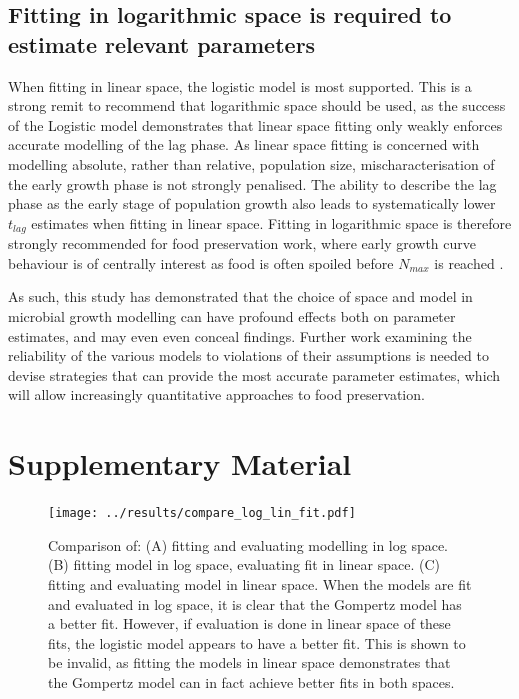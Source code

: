 \documentclass[11pt, a4paper]{article}
\newcommand{\beginsupplement}{%
        \setcounter{table}{0}
        \renewcommand{\thetable}{S\arabic{table}}%
        \setcounter{figure}{0}
        \renewcommand{\thefigure}{S\arabic{figure}}%
}
\begin{document}
\begin{linenumbers}
\subsection{Fitting in logarithmic space is required to estimate relevant parameters}
When fitting in linear space, the logistic model is most supported. This is a strong remit to recommend that logarithmic space should be used, as the success of the Logistic model demonstrates that linear space fitting only weakly enforces accurate modelling of the lag phase. As linear space fitting is concerned with modelling absolute, rather than relative, population size, mischaracterisation of the early growth phase is not strongly penalised. The ability to describe the lag phase as the early stage of population growth also leads to systematically lower $t_{lag}$ estimates when fitting in linear space. Fitting in logarithmic space is therefore strongly recommended for food preservation work, where early growth curve behaviour is of centrally interest as food is often spoiled before $N_{max}$ is reached \cite{MicrobialGrowth}.

As such, this study has demonstrated that the choice of space and model in microbial growth modelling can have profound effects both on parameter estimates, and may even even conceal findings. Further work examining the reliability of the various models to violations of their assumptions is needed to devise strategies that can provide the most accurate parameter estimates, which will allow increasingly quantitative approaches to food preservation.


\end{linenumbers}

\section{Supplementary Material}
\beginsupplement

        \begin{figure}[H]
        \texttt{[image: ../results/compare\_log\_lin\_fit.pdf]}
        \captionsetup{format=hang}
        \caption{Comparison of: (A) fitting and evaluating modelling in log space. (B) fitting model in log space, evaluating fit in linear space. (C) fitting and evaluating model in linear space. \newline When the models are fit and evaluated in log space, it is clear that the Gompertz model has a better fit. However, if evaluation is done in linear space of these fits, the logistic model appears to have a better fit. This is shown to be invalid, as fitting the models in linear space demonstrates that the Gompertz model can in fact achieve better fits in both spaces.  }
        \label{sup:compare_least_squares}
        \end{figure}
        
\end{document}
